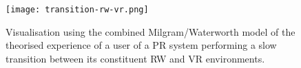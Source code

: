 

\begin{figure}[h]
	\begin{center}
		\texttt{[image: transition-rw-vr.png]}
		\caption{Visualisation using the combined Milgram/Waterworth model of the theorised experience of a user of a PR system performing a slow transition between its constituent RW and VR environments.}
		\label{focus-locus-sensus-with-virtuality-continuum-with-transition}
	\end{center}	
\end{figure}






